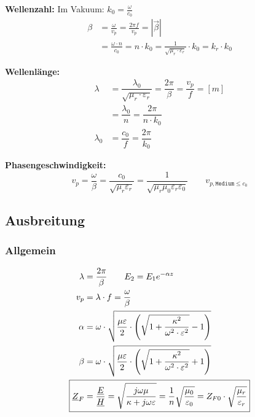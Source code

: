 \textbf{Wellenzahl:}
Im Vakuum: $k_{0}=\frac{\omega}{c_{0}}$
\begin{align*}
    \beta & = \frac{\omega}{v_p} = \frac{2 \pi f}{v_p} = |\vec{\beta}|                                                                      \\
      & = \frac{\omega \cdot n}{c_{0}} = n \cdot k_{0}=\frac{1}{\sqrt{\mu_{r} \cdot \varepsilon_{r}}} \cdot k_{0}=k_{r} \cdot k_{0}
\end{align*}

\textbf{Wellenlänge:}
\begin{align*}
    \lambda   & = \dfrac{\lambda_0}{\sqrt{\mu_r \cdot \varepsilon_r}} = \dfrac{2 \pi}{\beta} = \dfrac{v_p}{f} = [m] \\
              & = \dfrac{\lambda_0}{n} = \dfrac{2 \pi}{n \cdot k_0}                                             \\
    \lambda_0 & = \dfrac{c_0}{f} = \dfrac{2\pi}{k_0}
\end{align*}

\textbf{Phasengeschwindigkeit:}
\[
    v_p = \dfrac{\omega}{\beta} = \frac{c_0}{\sqrt{ \mu_r \varepsilon_r }}  = \frac{1}{\sqrt{ \mu_r \mu_0 \varepsilon_r \varepsilon_0}} \qquad v_{p,\texttt{Medium} \leq c_0}
\]


\subsection{Ausbreitung}
\subsubsection{Allgemein}
\begin{align*}
    \lambda                 & = \dfrac{2\pi}{\beta} \qquad E_2 = E_1 e^{-\alpha z}                                                                                        \\
    v_p                     & = \lambda\cdot f = \dfrac{\omega}{\beta}                                                                                                    \\
    \alpha                  & = \omega \cdot \sqrt{\dfrac{\mu \varepsilon}{2}\cdot \left(\sqrt{1+\dfrac{\kappa^2}{\omega^2\cdot\varepsilon^2}} - 1\right)}   \\
    \beta                   & = \omega \cdot \sqrt{\dfrac{\mu \varepsilon}{2}\cdot \left(\sqrt{1+\dfrac{\kappa^2}{\omega^2\cdot\varepsilon^2}} + 1\right)} \\
    \Aboxed{\underline{Z}_F & = \dfrac{\underline{E}}{\underline{H}} = \sqrt{\dfrac{j\omega\mu}{\kappa+j\omega\varepsilon}} = \dfrac{1}{n}\sqrt{\dfrac{\mu_0}{\varepsilon_0}} = Z_{F0} \cdot \sqrt{\dfrac{\mu_r}{\varepsilon_r }}}                                              \\
\end{align*}

